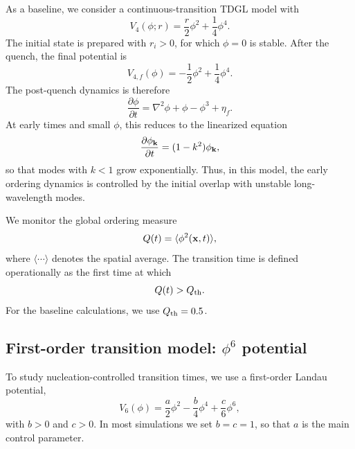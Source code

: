 ﻿\documentclass[aps,pre,preprint,showkeys,amsmath,amssymb,superscriptaddress,longbibliography]{revtex4-2}
\begin{document}
As a baseline, we consider a continuous-transition TDGL model with
\begin{equation}
V_4(\phi;r)=\frac{r}{2}\phi^2+\frac{1}{4}\phi^4.
\end{equation}
The initial state is prepared with $r_i>0$, for which $\phi=0$ is stable. After the quench, the final potential is
\begin{equation}
V_{4,f}(\phi)=-\frac{1}{2}\phi^2+\frac{1}{4}\phi^4.
\end{equation}
The post-quench dynamics is therefore
\begin{equation}
\frac{\partial \phi}{\partial t}=\nabla^2\phi+\phi-\phi^3+\eta_f.
\end{equation}
At early times and small $\phi$, this reduces to the linearized equation
\begin{equation}
\frac{\partial \phi_{\bf k}}{\partial t}=(1-k^2)\phi_{\bf k},
\end{equation}
so that modes with $k<1$ grow exponentially. Thus, in this model, the early ordering dynamics is controlled by the initial overlap with unstable long-wavelength modes.

We monitor the global ordering measure
\begin{equation}
Q(t)=\langle \phi^2({\bf x},t)\rangle,
\end{equation}
where $\langle\cdots\rangle$ denotes the spatial average. The transition time is defined operationally as the first time at which
\begin{equation}
Q(t)>Q_{\rm th}.
\end{equation}
For the baseline calculations, we use $Q_{\rm th}=0.5$.

\subsection{First-order transition model: \texorpdfstring{$\phi^6$}{phi6} potential}\label{first-order-transition-model-phi6-potential}

To study nucleation-controlled transition times, we use a first-order Landau potential,
\begin{equation}
V_6(\phi)=\frac{a}{2}\phi^2-\frac{b}{4}\phi^4+\frac{c}{6}\phi^6,
\end{equation}
with $b>0$ and $c>0$. In most simulations we set $b=c=1$, so that $a$ is the main control parameter.
\end{document}
